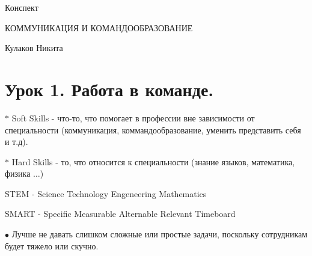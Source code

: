\documentclass[12pt,a4paper]{report}
\begin{document}
	
\begin{comment}
	https://www.opennet.ru/docs/RUS/latex/node2.html - секционирование
	https://www.linux.org.ru/forum/general/6926046 - многострочные комментарии
	https://www.opennet.ru/docs/RUS/latex/node2.html - верстка текста
	http://blog.harrix.org/article/661 - ссылки, гиперссылки
	http://mydebianblog.blogspot.com/2011/05/latex.html - оглавления (нумерация, переименование)	
	https://tex.stackexchange.com/questions/45948/what-is-the-difference-between-hspace-fill-and-hfill - горизонтальное заполнение.
	
	http://mif.vspu.ru/books/ASYfb.pdf - рисунки
	https://www.mccme.ru/free-books/llang/newllang.pdf - книжка
	http://www.ict.nsc.ru/jspui/bitstream/ICT/1488/1/pgf-ru-all-method.pdf - tikz
	https://engraver.wordpress.com/2011/08/27/tikz-%
\end{comment}

\thispagestyle{empty}
{\Large Конспект}

\vspace*{230pt}
\begin{center}
\medskip
{\LARGE КОММУНИКАЦИЯ И КОМАНДООБРАЗОВАНИЕ}
\end{center}

\vspace{300pt}
\begin{flushright}
	{\LARGE Кулаков Никита}
\end{flushright}
\vspace*{\fill}
		
\newpage
\setcounter{page}{1}
\section*{Урок 1. Работа в команде.}
$\ast$ Soft Skills - что-то, что помогает в профессии вне зависимости от специальности
 (коммуникация, коммандообразование, уменить представить себя и т.д).

\medskip
$\ast$ Hard Skills - то, что относится к специальности (знание языков, математика, физика $\dots$)

\medskip\medskip
STEM - Science Technology Engeneering Mathematics

\medskip
SMART - Specific Measurable Alternable Relevant Timeboard

\bigskip
$\bullet$ Лучше не давать слишком сложные или простые задачи, поскольку сотрудникам будет
тяжело или скучно.
\end{document}
